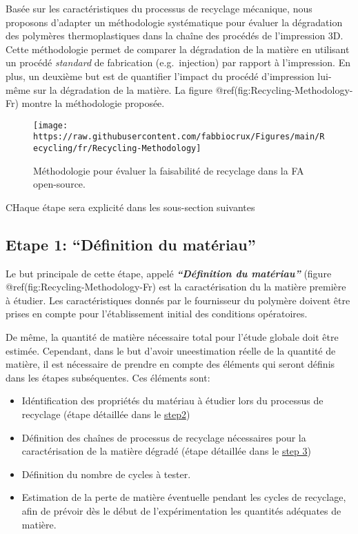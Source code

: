 \documentclass[
]{article}
\providecommand{\tightlist}{%
  \setlength{\itemsep}{0pt}\setlength{\parskip}{0pt}}
\begin{document}
Basée sur les caractéristiques du processus de recyclage mécanique, nous
proposons d'adapter un méthodologie systématique pour évaluer la
dégradation des polymères thermoplastiques dans la chaîne des procédés
de l'impression 3D. Cette méthodologie permet de comparer la dégradation
de la matière en utilisant un procédé \emph{standard} de fabrication
(e.g.~injection) par rapport à l'impression. En plus, un deuxième but
est de quantifier l'impact du procédé d'impression lui-même sur la
dégradation de la matière. La figure @ref(fig:Recycling-Methodology-Fr)
montre la méthodologie proposée.

\begin{figure}

{\centering \texttt{[image: https://raw.githubusercontent.com/fabbiocrux/Figures/main/Recycling/fr/Recycling-Methodology]} 

}

\caption{Méthodologie pour évaluer la faisabilité de recyclage dans la FA open-source.}\label{fig:Recycling-Methodology-Fr}
\end{figure}

CHaque étape sera explicité dans les sous-section suivantes

\hypertarget{etape-1-duxe9finition-du-matuxe9riau}{%
\subsection{Etape 1: ``Définition du
matériau''}\label{etape-1-duxe9finition-du-matuxe9riau}}

Le but principale de cette étape, appelé \textbf{\emph{``Définition du
matériau''}} (figure @ref(fig:Recycling-Methodology-Fr) est la
caractérisation du la matière première à étudier. Les caractéristiques
donnés par le fournisseur du polymère doivent être prises en compte pour
l'établissement initial des conditions opératoires.

De même, la quantité de matière nécessaire total pour l'étude globale
doit être estimée. Cependant, dans le but d'avoir uneestimation réelle
de la quantité de matière, il est nécessaire de prendre en compte des
éléments qui seront définis dans les étapes subséquentes. Ces éléments
sont:

\begin{itemize}
\tightlist
\item
  Idéntification des propriétés du matériau à étudier lors du processus
  de recyclage (étape détaillée dans le
  \protect\hyperlink{Step2}{step2})
\item
  Définition des chaînes de processus de recyclage nécessaires pour la
  caractérisation de la matière dégradé (étape détaillée dans le
  \protect\hyperlink{Step3}{step 3})
\item
  Définition du nombre de cycles à tester.
\item
  Estimation de la perte de matière éventuelle pendant les cycles de
  recyclage, afin de prévoir dès le début de l'expérimentation les
  quantités adéquates de matière.
\end{itemize}
\end{document}
